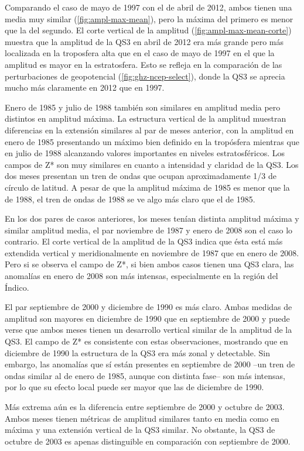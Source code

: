 \documentclass[spanish,a4paper,12pt,oneside]{book}
\begin{document}
Comparando el caso de mayo de 1997 con el de abril de 2012, ambos tienen
una media muy similar (\autoref{fig:ampl-max-mean}), pero la máxima del
primero es menor que la del segundo. El corte vertical de la amplitud
(\autoref{fig:ampl-max-mean-corte}) muestra que la amplitud de la QS3 en
abril de 2012 era más grande pero más localizada en la troposfera alta
que en el caso de mayo de 1997 en el que la amplitud es mayor en la
estratosfera. Esto se refleja en la comparación de las perturbaciones de
geopotencial (\autoref{fig:ghz-ncep-select}), donde la QS3 se aprecia
mucho más claramente en 2012 que en 1997.

Enero de 1985 y julio de 1988 también son similares en amplitud media
pero distintos en amplitud máxima. La estructura vertical de la amplitud
muestran diferencias en la extensión similares al par de meses anterior,
con la amplitud en enero de 1985 presentando un máximo bien definido en
la tropósfera mientras que en julio de 1988 alcanzando valores
importantes en niveles estratosféricos. Los campos de Z* son muy
similares en cuanto a intensidad y claridad de la QS3. Los dos meses
presentan un tren de ondas que ocupan aproximadamente 1/3 de círculo de
latitud. A pesar de que la amplitud máxima de 1985 es menor que la de
1988, el tren de ondas de 1988 se ve algo más claro que el de 1985.

En los dos pares de casos anteriores, los meses tenían distinta amplitud
máxima y similar amplitud media, el par noviembre de 1987 y enero de
2008 son el caso lo contrario. El corte vertical de la amplitud de la
QS3 indica que ésta está más extendida vertical y meridionalmente en
noviembre de 1987 que en enero de 2008. Pero si se observa el campo de
Z*, si bien ambos casos tienen una QS3 clara, las anomalías en enero de
2008 son más intensas, especialmente en la región del Índico.

El par septiembre de 2000 y diciembre de 1990 es más claro. Ambas
medidas de amplitud son mayores en diciembre de 1990 que en septiembre
de 2000 y puede verse que ambos meses tienen un desarrollo vertical
similar de la amplitud de la QS3. El campo de Z* es consistente con
estas observaciones, mostrando que en diciembre de 1990 la estructura de
la QS3 era más zonal y detectable. Sin embargo, las anomalías que sí
están presentes en septiembre de 2000 --un tren de ondas similar al de
enero de 1985, aunque con distinta fase-- son más intensas, por lo que
su efecto local puede ser mayor que las de diciembre de 1990.

Más extrema aún es la diferencia entre septiembre de 2000 y octubre de
2003. Ambos meses tienen métricas de amplitud similares tanto en media
como en máxima y una extensión vertical de la QS3 similar. No obstante,
la QS3 de octubre de 2003 es apenas distinguible en comparación con
septiembre de 2000.
\end{document}
